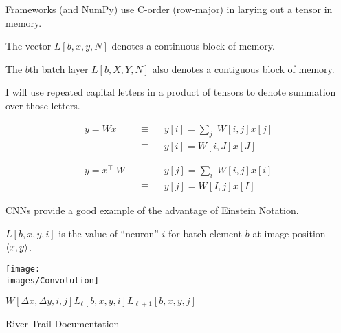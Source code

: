 {

Frameworks (and NumPy) use C-order (row-major) in larying out a tensor in memory.

\vfill
The vector $L[b,x,y,N]$ denotes a continuous block of memory.

\vfill
The $b$th batch layer $L[b,X,Y,N]$ also denotes a contiguous block of memory.

I will use repeated capital letters in a product of tensors to denote summation over those letters.

\vfill
\begin{eqnarray*}
y = Wx &\;\;\;\equiv\;\;\; & y[i] = \sum_j \;W[i,j]x[j] \\
& \;\;\;\equiv \;\;\; & y[i] = W[i,J]x[J] \\
\\
\\
y = x^\top\;W & \;\;\;\equiv \;\;\; & y[j] = \sum_i \;W[i,j]x[i] \\
& \;\;\;\equiv \;\;\; & y[j] = W[I,j]x[I]
\end{eqnarray*}



CNNs provide a good example of the advantage of Einstein Notation.

\vfill
{\color{red} $L[b,x,y,i]$} is the value of ``neuron'' $i$ for batch element $b$ at image position ${\mbox{$\langle x,y\rangle$}}$.

\centerline{\texttt{[image: \\images/Convolution]}}
\centerline{$W[\Delta x,\Delta y,i,j]$\hspace{6ex}$L_{{\ell}}[b,x,y,i]$\hspace{6ex}$L_{{\ell+1}}[b,x,y,j]$}
\centerline{\large River Trail Documentation}

}
